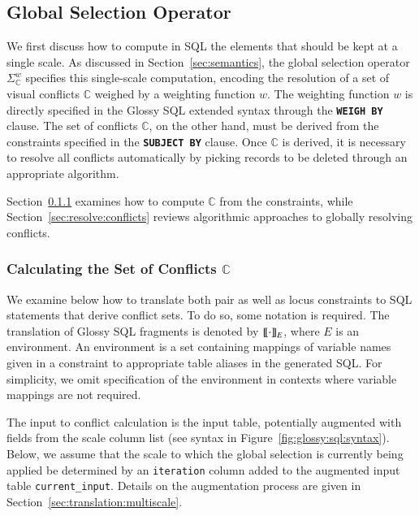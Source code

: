 \documentclass[11pt, oneside]{report}
\newcommand{\denote}[1]{\text{$[\![ $#1$ ]\!]$}}
\begin{document}
{\subsection{Global Selection Operator}
\label{sec:translation:global:selection}

We first discuss how to compute in SQL the elements that should be kept at a single scale. As discussed in Section~\ref{sec:semantics}, the global selection operator $\Sigma_{\mathbb{C}}^{w}$ specifies this single-scale computation, encoding the resolution of a set of visual conflicts $\mathbb{C}$ weighed by a weighting function $w$. The weighting function $w$ is directly specified in the Glossy SQL extended syntax through the \textbf{\texttt{WEIGH BY}} clause. The set of conflicts $\mathbb{C}$, on the other hand, must be derived from the constraints specified in the \textbf{\texttt{SUBJECT BY}} clause. Once $\mathbb{C}$ is derived, it is necessary to resolve all conflicts automatically by picking records to be deleted through an appropriate algorithm.  

Section~\ref{sec:calc:conflicts} examines how to compute $\mathbb{C}$ from the constraints, while Section~\ref{sec:resolve:conflicts} reviews algorithmic approaches to globally resolving conflicts. 

\subsubsection{Calculating the Set of Conflicts $\mathbb{C}$}
\label{sec:calc:conflicts}

We examine below how to translate both pair as well as locus constraints to SQL statements that derive conflict sets. To do so, some notation is required. The translation of Glossy SQL fragments is denoted by $\denote{$\cdot$}_E$, where $E$ is an environment. An environment is a set containing mappings of variable names given in a constraint to appropriate table aliases in the generated SQL. For simplicity, we omit specification of the environment in contexts where variable mappings are not required.  

The input to conflict calculation is the input table, potentially augmented with fields from the scale column list (see syntax in Figure~\ref{fig:glossy:sql:syntax}). Below, we assume that the scale to which the global selection is currently being applied be determined by an \texttt{iteration} column added to the augmented input table \texttt{current\_input}. Details on the augmentation process are given in Section~\ref{sec:translation:multiscale}. 

}
\end{document}
